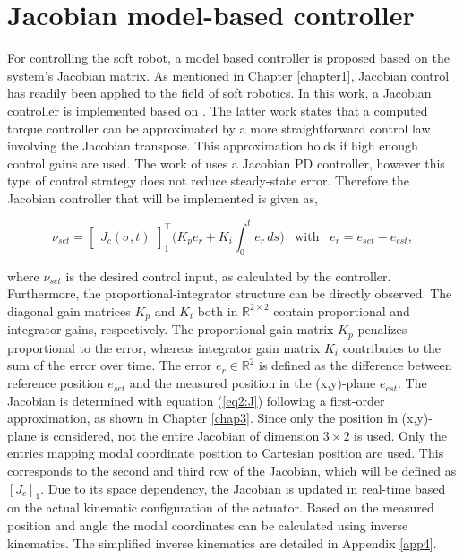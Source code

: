 \section{Jacobian model-based controller}


For controlling the soft robot, a model based controller is proposed based on the system's Jacobian matrix. As mentioned in Chapter \ref{chapter1}, Jacobian control has readily been applied to the field of soft robotics. In this work, a Jacobian controller is implemented based on \cite{MOOSAVIAN20071226}. The latter work states that a computed torque controller can be approximated by a more straightforward control law involving the Jacobian transpose. This approximation holds if high enough control gains are used. The work of \cite{MOOSAVIAN20071226} uses a Jacobian PD controller, however this type of control strategy does not reduce steady-state error. Therefore the Jacobian controller that will be implemented is given as,


\begin{equation}
    \nu_{set} = \begin{bmatrix}J_c(\sigma,t)\end{bmatrix}_1^\top \Big(K_p e_r + K_i \int_0^t e_r \hspace{2pt} ds \Big) \hspace{10pt} \text{with} \hspace{10pt} e_r = e_{set}-e_{est}, 
    \label{eq:tau}
\end{equation}

where $\nu_{set}$ is the desired control input, as calculated by the controller. Furthermore, the proportional-integrator structure can be directly observed. The diagonal gain matrices $K_p$ and $K_i$ both in $\mathbb{R}^{2\times 2}$ contain proportional and integrator gains, respectively. The proportional gain matrix $K_p$ penalizes proportional to the error, whereas integrator gain matrix $K_i$ contributes to the sum of the error over time. The error $e_r \in \mathbb{R}^2$ is defined as the difference between reference position $e_{set}$ and the measured position in the (x,y)-plane $e_{est}$. The Jacobian is determined with equation (\ref{eq2:J}) following a first-order approximation, as shown in Chapter \ref{chap3}. Since only the position in (x,y)-plane is considered, not the entire Jacobian of dimension $3 \times 2$ is used. Only the entries mapping modal coordinate position to Cartesian position are used. This corresponds to the second and third row of the Jacobian, which will be defined as $[J_c]_1$. Due to its space dependency, the Jacobian is updated in real-time based on the actual kinematic configuration of the actuator. Based on the measured position and angle the modal coordinates can be calculated using inverse kinematics. The simplified inverse kinematics are detailed in Appendix \ref{app4}.


